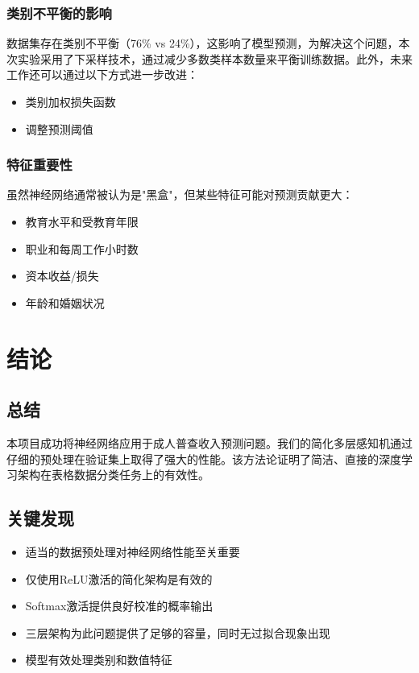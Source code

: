 \documentclass[conference]{IEEEtran}
\begin{document}
\subsubsection{类别不平衡的影响}
数据集存在类别不平衡（76\% vs 24\%），这影响了模型预测，为解决这个问题，本次实验采用了下采样技术，通过减少多数类样本数量来平衡训练数据。此外，未来工作还可以通过以下方式进一步改进：
\begin{itemize}
    \item 类别加权损失函数
    \item 调整预测阈值
\end{itemize}

\subsubsection{特征重要性}
虽然神经网络通常被认为是"黑盒"，但某些特征可能对预测贡献更大：
\begin{itemize}
    \item 教育水平和受教育年限
    \item 职业和每周工作小时数
    \item 资本收益/损失
    \item 年龄和婚姻状况
\end{itemize}

\section{结论}

\subsection{总结}
本项目成功将神经网络应用于成人普查收入预测问题。我们的简化多层感知机通过仔细的预处理在验证集上取得了强大的性能。该方法论证明了简洁、直接的深度学习架构在表格数据分类任务上的有效性。

\subsection{关键发现}
\begin{itemize}
    \item 适当的数据预处理对神经网络性能至关重要
    \item 仅使用ReLU激活的简化架构是有效的
    \item Softmax激活提供良好校准的概率输出
    \item 三层架构为此问题提供了足够的容量，同时无过拟合现象出现
    \item 模型有效处理类别和数值特征
\end{itemize}
\end{document}
